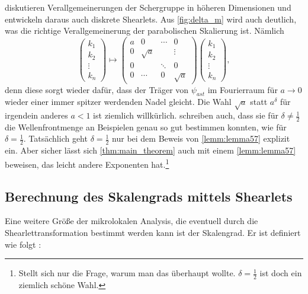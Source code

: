 \textcite{Guo2006} diskutieren Verallgemeinerungen der Schergruppe in höheren Dimensionen und entwickeln daraus auch diskrete Shearlets. Aus \cref{fig:delta_m} wird auch deutlich, was die richtige Verallgemeinerung der parabolischen Skalierung ist. Nämlich
\begin{equation*}
\begin{pmatrix}
k_1 \\ k_2 \\ \vdots \\ k_n
\end{pmatrix}
\mapsto
\begin{pmatrix}
	a & 0 		& \cdots & 0\\
	0 & \sqrt a & 		 & 	\vdots\\
	0 & 			& \ddots & 0 \\
	0 & \cdots  & 	0    & \sqrt{a}
\end{pmatrix}
\begin{pmatrix}
k_1 \\ k_2 \\ \vdots \\ k_n
\end{pmatrix},
\end{equation*}
denn diese sorgt wieder dafür, dass der Träger von $\psi_{ast}$ im Fourierraum für $a \to 0$ wieder einer immer spitzer werdenden Nadel gleicht. Die Wahl $\sqrt{a}$ statt $a^\delta$ für irgendein anderes $a<1$ ist ziemlich willkürlich. \textcite{Kutyniok2008} schreiben auch, dass sie für $\delta \neq \frac{1}{2}$ die Wellenfrontmenge an Beispielen genau so gut bestimmen konnten, wie für $\delta = \frac{1}{2}$. Tatsächlich geht $\delta = \frac{1}{2}$ nur bei dem Beweis von \cref{lemm:lemma57} explizit ein. Aber sicher lässt sich \cref{thm:main_theorem} auch mit einem \cref{lemm:lemma57} beweisen, das leicht andere Exponenten hat.\footnote{Stellt sich nur die Frage, warum man das überhaupt wollte. $\delta = \frac{1}{2}$ ist doch ein ziemlich schöne Wahl.}

\subsection{Berechnung des Skalengrads mittels Shearlets}
\label{sec:scaling_degree}
Eine weitere Größe der mikrolokalen Analysis, die eventuell durch die Shearlettransformation bestimmt werden kann ist der Skalengrad. Er ist definiert wie folgt \cite{Steinman1971}:

